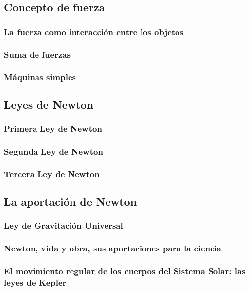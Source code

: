 \documentclass[11pt]{book}
\begin{document}
\section{Concepto de fuerza}
\subsection{La fuerza como interacci\'on entre los objetos}
\subsection{Suma de fuerzas}
\subsection{M\'aquinas simples}

\section{Leyes de Newton}
\subsection{Primera Ley de Newton}
\subsection{Segunda Ley de Newton}
\subsection{Tercera Ley de Newton}

\section{La aportaci\'on de Newton}
\subsection{Ley de Gravitaci\'on Universal}
\subsection{Newton, vida y obra, sus aportaciones para la ciencia}
\subsection{El movimiento regular de los cuerpos del Sistema Solar: las leyes de Kepler}

\chapter{}
\end{document}
